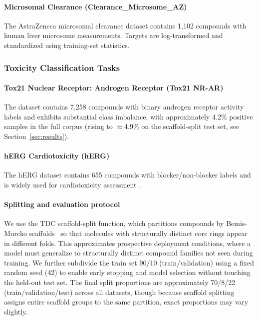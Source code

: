 \documentclass[journal]{IEEEtran}
\begin{document}
\paragraph{Microsomal Clearance (Clearance\_Microsome\_AZ)}
The AstraZeneca microsomal clearance dataset contains 1,102 compounds with human liver microsome measurements. Targets are log-transformed and standardized using training-set statistics.

\subsubsection{Toxicity Classification Tasks}

\paragraph{Tox21 Nuclear Receptor: Androgen Receptor (Tox21 NR-AR)}
The dataset contains 7,258 compounds with binary androgen receptor activity labels and exhibits substantial class imbalance, with approximately 4.2\% positive samples in the full corpus (rising to $\approx$4.9\% on the scaffold-split test set, see Section~\ref{sec:results}).

\paragraph{hERG Cardiotoxicity (hERG)}
The hERG dataset contains 655 compounds with blocker/non-blocker labels and is widely used for cardiotoxicity assessment~\cite{sanguinetti2006herg}.

\paragraph{Splitting and evaluation protocol}
We use the TDC scaffold-split function, which partitions compounds by Bemis-Murcko scaffolds~\cite{doi:10.1021/jm9602928} so that molecules with structurally distinct core rings appear in different folds. This approximates prospective deployment conditions, where a model must generalize to structurally distinct compound families not seen during training. We further subdivide the train set 90/10 (train/validation) using a fixed random seed (42) to enable early stopping and model selection without touching the held-out test set. The final split proportions are approximately 70/8/22 (train/validation/test) across all datasets, though because scaffold splitting assigns entire scaffold groups to the same partition, exact proportions may vary slightly.
\end{document}
